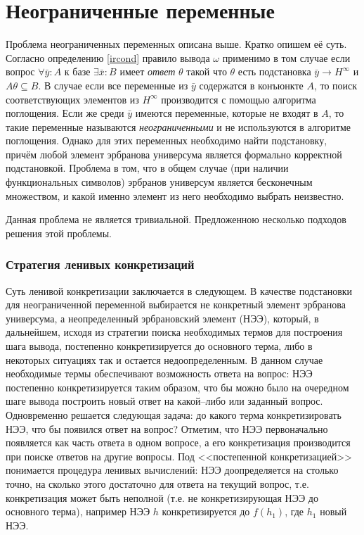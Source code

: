 \section{Неограниченные переменные}
\label{s:uhe}
Проблема неограниченных переменных описана выше. Кратко опишем её суть. Согласно определению \ref{ircond} правило вывода $\omega$ применимо в том случае если вопрос $\forall \bar{y}\colon A$ к базе $\exists \bar{x}\colon B$ имеет {\em ответ} $\theta$  такой что $\theta$ есть подстановка $\bar{y} \rightarrow H^{\infty}$ и $A\theta \subseteq B$. В случае если все переменные из $\bar{y}$ содержатся в конъюнкте $A$, то поиск соответствующих элементов из $H^{\infty}$ производится с помощью алгоритма поглощения. Если же среди $\bar{y}$ имеются переменные, которые не входят в $A$, то такие переменные называются \emph{неограниченными} и не используются в алгоритме поглощения. Однако для этих переменных необходимо найти подстановку, причём любой элемент эрбранова универсума является формально корректной подстановкой. Проблема в том, что в общем случае (при наличии функциональных символов) эрбранов универсум является бесконечным множеством, и какой именно элемент из него необходимо выбрать неизвестно.

Данная проблема не является тривиальной. Предложенною несколько подходов решения этой проблемы.

\subsubsection{Стратегия ленивых конкретизаций}
Суть ленивой конкретизации заключается в следующем. В качестве подстановки для неограниченной переменной выбирается не конкретный элемент эрбранова универсума, а неопределенный эрбрановский элемент (НЭЭ), который, в дальнейшем, исходя из стратегии поиска необходимых термов для построения шага вывода, постепенно конкретизируется до основного терма, либо в некоторых ситуациях так и остается недоопределенным. В данном случае необходимые термы обеспечивают возможность ответа на вопрос: НЭЭ постепенно конкретизируется таким образом, что бы можно было на очередном шаге вывода построить новый ответ на какой--либо или заданный вопрос. Одновременно решается следующая задача: до какого терма конкретизировать НЭЭ, что бы появился ответ на вопрос? Отметим, что НЭЭ первоначально появляется как часть ответа в одном вопросе, а его конкретизация производится при поиске ответов на другие вопросы. Под <<постепенной конкретизацией>> понимается процедура ленивых вычислений: НЭЭ доопределяется на столько точно, на сколько этого достаточно для ответа на текущий вопрос, т.е. конкретизация может быть неполной (т.е. не конкретизирующая НЭЭ до основного терма), например НЭЭ $h$ конкретизируется до $f(h_1)$, где $h_1$ новый НЭЭ.

